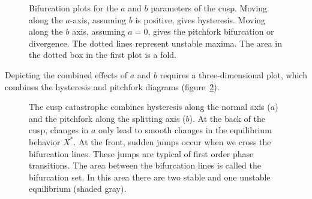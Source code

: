 \documentclass[
  a4paper,
  DIV=11,
  numbers=noendperiod,
  oneside]{scrreprt}
\begin{document}
\begin{figure}


\caption{\label{fig-ch3-img9-old-21}Bifurcation plots for the \(a\) and
\(b\) parameters of the cusp. Moving along the \(a\)-axis, assuming
\(b\) is positive, gives hysteresis. Moving along the \(b\) axis,
assuming \(a=0\), gives the pitchfork bifurcation or divergence. The
dotted lines represent unstable maxima. The area in the dotted box in
the first plot is a fold.}

\end{figure}%

Depicting the combined effects of \(a\) and \(b\) requires a
three-dimensional plot, which combines the hysteresis and pitchfork
diagrams (figure~\ref{fig-ch3-img10-old-22}).

\begin{figure}


\caption{\label{fig-ch3-img10-old-22}The cusp catastrophe combines
hysteresis along the normal axis (\(a\)) and the pitchfork along the
splitting axis (\(b\)). At the back of the cusp, changes in \(a\) only
lead to smooth changes in the equilibrium behavior \(X^{*}\). At the
front, sudden jumps occur when we cross the bifurcation lines. These
jumps are typical of first order phase transitions. The area between the
bifurcation lines is called the bifurcation set. In this area there are
two stable and one unstable equilibrium (shaded gray).}

\end{figure}%
\end{document}
